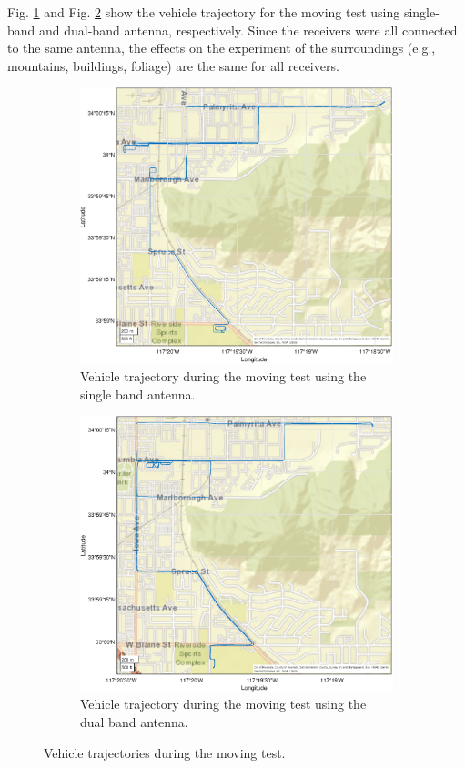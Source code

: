 \documentclass[letterpaper, 10 pt,onecolumn]{article}
\begin{document}
	Fig. \ref{fig:trj_mt1} and Fig. \ref{fig:trj_mt2} show the vehicle trajectory for the moving test using single-band and dual-band antenna, respectively.
	Since the receivers were all connected to the same antenna, the effects on the experiment of the surroundings (e.g., mountains, buildings, foliage) are the same for all receivers. 
	\begin{figure}[H]
		\centering
		\hfill
		\begin{subfigure}{.45\textwidth}
			\includegraphics[width=\linewidth]{figures/trajectory_single.eps}
			\caption{Vehicle trajectory during the moving test using the single band antenna.}
			\label{fig:trj_mt1}
		\end{subfigure}%
		\hfill
		\begin{subfigure}{.45\textwidth}
			\includegraphics[width=\linewidth]{figures/trajectory_dual.eps}
			\caption{Vehicle trajectory during the moving test using the dual band antenna.}
			\label{fig:trj_mt2}
		\end{subfigure}
		\hfill
		\caption[short]{Vehicle trajectories during the moving test.}
		\label{fig:trj}
	\end{figure}%
	
\end{document}
